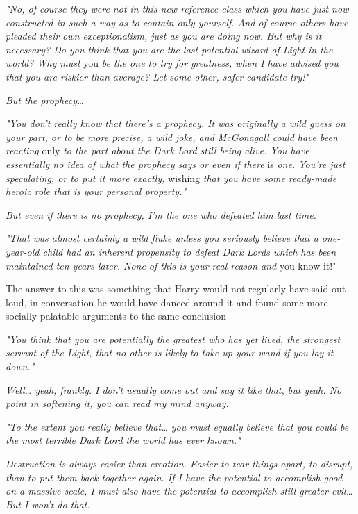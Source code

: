 \emph{"No, of course they were not in this new reference class which you have 
just now constructed in such a way as to contain only yourself. And of course 
others have pleaded their own exceptionalism, just as you are doing now. But 
why is it necessary? Do you think that you are the last potential wizard of 
Light in the world? Why must} you\emph{ be the one to try for greatness, when I 
have advised you that you are riskier than average? Let some other, safer 
candidate try!"}

\emph{But the prophecy{\ldots}}

\emph{"You don't really know that there's a prophecy. It was originally a wild 
guess on your part, or to be more precise, a wild joke, and McGonagall could 
have been reacting} only\emph{ to the part about the Dark Lord still being 
alive. You have essentially no idea of what the prophecy says or even if there} 
is\emph{ one. You're just speculating, or to put it more exactly,} wishing 
\emph{that you have some ready-made heroic role that is your personal 
property."}

\emph{But even if there is no prophecy, I'm the one who defeated him last time.}

\emph{"That was almost certainly a wild fluke unless you seriously believe that 
a one-year-old child had an inherent propensity to defeat Dark Lords which has 
been maintained ten years later. None of this is your real reason and} you know 
it!"

The answer to this was something that Harry would not regularly have said out 
loud, in conversation he would have danced around it and found some more 
socially palatable arguments to the same conclusion---

\emph{"You think that you are potentially the greatest who has yet lived, the 
strongest servant of the Light, that no other is likely to take up your wand if 
you lay it down."}

\emph{Well{\ldots} yeah, frankly. I don't usually come out and say it like 
that, but yeah. No point in softening it, you can read my mind anyway.}

\emph{"To the extent you really believe that{\ldots} you must equally believe 
that you could be the most terrible Dark Lord the world has ever known."}

\emph{Destruction is always easier than creation. Easier to tear things apart, 
to disrupt, than to put them back together again. If I have the potential to 
accomplish good on a massive scale, I must also have the potential to 
accomplish still greater evil{\ldots} But I won't do that.}


